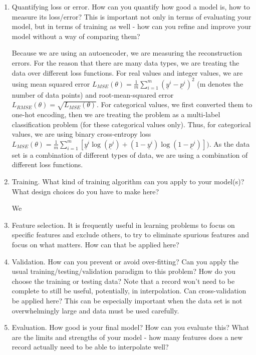 \documentclass[11pt, a4paper]{article}
\begin{document}
\begin{enumerate}
	\item{Quantifying loss or error. How can you quantify how good a model is, how to measure its loss/error? This is important not only in terms of evaluating your model, but in terms of training as well - how can you refine and improve your model without a way of comparing them?}
	\par{Because we are using an autoencoder, we are measuring the reconstruction errors. For the reason that there are many data types, we are treating the data over different loss functions. For real values and integer values, we are using mean squared error $ L_{MSE}(\theta) = \frac{1}{m}\sum_{i=1}^{m}(\underline{y}^i - \underline{p}^i)^2 $ (m denotes the number of data points) and root-mean-squared error $ L_{RMSE}(\theta) = \sqrt{L_{MSE}(\theta)} $. For categorical values, we first converted them to one-hot encoding, then we are treating the problem as a multi-label classification problem (for these categorical values only). Thus, for categorical values, we are using binary cross-entropy loss $ L_{MSE}(\theta) = \frac{1}{m}\sum_{i=1}^{m}[\underline{y}^i \log (\underline{p}^i) + (1 - \underline{y}^i) \log (1 - \underline{p}^i)]) $. As the data set is a combination of different types of data, we are using a combination of different loss functions.}
	
	\item{Training. What kind of training algorithm can you apply to your model(s)? What design choices do you have to make here?}
	\par{We }
	
	\item{Feature selection. It is frequently useful in learning problems to focus on specific features and exclude others, to try to eliminate spurious features and focus on what matters. How can that be applied here?}
	
	\item{Validation. How can you prevent or avoid over-fitting? Can you apply the usual training/testing/validation paradigm to this problem? How do you choose the training or testing data? Note that a record won’t need to be complete to still be useful, potentially, in interpolation. Can cross-validation be applied here? This can be especially important when the data set is not overwhelmingly large and data must be used carefully.}
	
	\item{Evaluation. How good is your final model? How can you evaluate this? What are the limits and strengths of your model - how many features does a new record actually need to be able to interpolate well?}
\end{enumerate}
\end{document}
